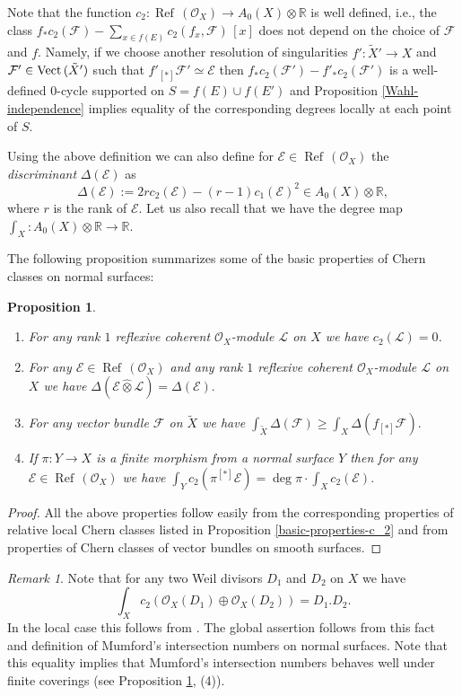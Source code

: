 \documentclass[twoside, 11pt]{article}
\theoremstyle{plain}
\newtheorem{Proposition}[Thm]{\sc Proposition}
\theoremstyle{definition}
\theoremstyle{remark}
\newtheorem{Remark}[Thm]{Remark}
\newcommand{\RR}{{\mathbb R}}
\newcommand{\cE}{{\mathcal E}}
\newcommand{\cF}{{\mathcal F}}
\newcommand{\cL}{{\mathcal L}}
\newcommand{\cO}{{\mathcal O}}
\newcommand{\Refl}{{\mathop{\operatorname{Ref}\, }}}
\newcommand{\Vect}{{\mathop{{\rm Vect \,}}}}
\begin{document}
Note that  the function $c_2: \Refl(\cO_X) \to A_0(X)\otimes \RR$ is well  defined, i.e., the class $f_*c_2 (\cF)-\sum _{x\in f(E)} c_2 (f_x, \cF) \, [x]$  does not depend on the choice of $\cF$ and $f$.
Namely, if we choose   another resolution of singularities $f': \tilde X'\to X$ and $\cF'\in \Vect (\tilde X')$ such that  $ f'_{[*]}\cF'\simeq \cE$ then $f_*c_2 (\cF ')-f'_*c_2 (\cF')$ is a well-defined $0$-cycle supported on $S=f(E)\cup f(E')$ and Proposition \ref{Wahl-independence} implies equality of the corresponding degrees locally at each point of $S$.

\medskip

Using the above definition we can also define for $\cE\in \Refl(\cO_X) $  the \emph{discriminant} $\Delta (\cE)$ as
$$\Delta (\cE):= 2r c_2 (\cE)- (r-1)c_1 (\cE)^2 \in  A_0(X)\otimes \RR,$$
where $r$ is the rank of $\cE$. Let us also recall that we have the degree map $\int _X: A_0(X)\otimes \RR \to \RR$.

The following proposition summarizes some of the basic properties of Chern classes on normal surfaces:

\begin{Proposition}\label{global-basic-properties-c_2}
\begin{enumerate}
\item For any rank $1$ reflexive coherent $\cO_X$-module $\cL$ on $X$ we have $c_2(\cL)=0$.
\item For any $\cE\in \Refl(\cO_X) $  and any rank $1$ reflexive coherent $\cO_X$-module $\cL$ on $X$ we have
$ \Delta (\cE \hat \otimes \cL)=\Delta (\cE).$
\item For any vector bundle $\cF$ on $\tilde X$ we have
$\int_{\tilde X} \Delta ( \cF) \ge  \int_{X} \Delta ( f_{[*]}\cF).$\item If  $ \pi: Y\to X$ is a finite morphism from a normal  surface $Y$ then for any $\cE\in \Refl(\cO_X) $ we have
$\int_Yc_2 ( \pi ^{[*]}\cE) = \deg \pi \cdot \int_Xc_2(\cE).$
\end{enumerate}
\end{Proposition}


\begin{proof}
All the above properties follow easily from  the corresponding properties of relative local Chern classes listed in Proposition \ref{basic-properties-c_2} and from properties of Chern classes of vector bundles on smooth surfaces. 
\end{proof}

\begin{Remark}\label{c_2-direct-sum}
Note that for any two Weil divisors $D_1$ and $D_2$ on $X$ we have
$$\int_X c_2 (\cO _X (D_1) \oplus \cO_X (D_2))= D_1.D_2.$$
In the local case this follows from \cite[Proposition 2.5]{Wa}. The global assertion follows from this fact and definition
of Mumford's intersection numbers on normal surfaces. Note that  this equality implies that Mumford's intersection numbers behaves well under finite coverings (see Proposition \ref{global-basic-properties-c_2}, (4)).
\end{Remark}
\end{document}
